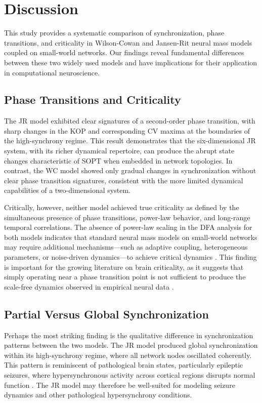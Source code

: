 \documentclass[12pt]{article}
\begin{document}
\section{Discussion}

This study provides a systematic comparison of synchronization, phase transitions, and criticality in Wilson-Cowan and Jansen-Rit neural mass models coupled on small-world networks. Our findings reveal fundamental differences between these two widely used models and have implications for their application in computational neuroscience.

\subsection{Phase Transitions and Criticality}

The JR model exhibited clear signatures of a second-order phase transition, with sharp changes in the KOP and corresponding CV maxima at the boundaries of the high-synchrony regime. This result demonstrates that the six-dimensional JR system, with its richer dynamical repertoire, can produce the abrupt state changes characteristic of SOPT when embedded in network topologies. In contrast, the WC model showed only gradual changes in synchronization without clear phase transition signatures, consistent with the more limited dynamical capabilities of a two-dimensional system.

Critically, however, neither model achieved true criticality as defined by the simultaneous presence of phase transitions, power-law behavior, and long-range temporal correlations. The absence of power-law scaling in the DFA analysis for both models indicates that standard neural mass models on small-world networks may require additional mechanisms---such as adaptive coupling, heterogeneous parameters, or noise-driven dynamics---to achieve critical dynamics \citep{haimovici2013brain}. This finding is important for the growing literature on brain criticality, as it suggests that simply operating near a phase transition point is not sufficient to produce the scale-free dynamics observed in empirical neural data \citep{beggs2003neuronal, stam2005nonlinear}.

\subsection{Partial Versus Global Synchronization}

Perhaps the most striking finding is the qualitative difference in synchronization patterns between the two models. The JR model produced global synchronization within its high-synchrony regime, where all network nodes oscillated coherently. This pattern is reminiscent of pathological brain states, particularly epileptic seizures, where hypersynchronous activity across cortical regions disrupts normal function \citep{jiruska2013synchronization}. The JR model may therefore be well-suited for modeling seizure dynamics and other pathological hypersynchrony conditions.
\end{document}
